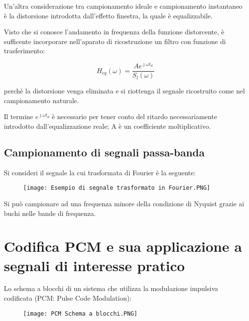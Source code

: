 Un'altra considerazione tra campionamento ideale e campionamento instantaneo è la distorsione introdotta dall'effetto finestra, la quale è equalizzabile. \newline 

Visto che si conosce l'andamento in frequenza della funzione distorcente, è sufficente incorporare 
nell'aparato di ricostruzione un filtro con funzione di trasferimento: 

{
    \Large 
    \begin{equation}
        H_{eq} (\omega) = 
        \frac{A e^{\jmath \omega t_d}}{S_l (\omega)} 
    \end{equation}
}

perchè la distorsione venga eliminata e si riottenga il segnale ricostruito come nel campionamento naturale. \newline 

Il termine $e^{\jmath \omega t_d}$ è necessario per tener conto del ritardo necessariamente introdotto dall'equalizzazione reale; 
A è un coefficiente moltiplicativo. \newline 

\newpage 

\subsection{Campionamento di segnali passa-banda} 

Si consideri il segnale la cui trasformata di Fourier è la seguente: 

\begin{figure}[h]
    \centering
    \texttt{[image: Esempio di segnale trasformato in Fourier.PNG]}
\end{figure}

Si può campionare ad una frequenza minore della condizione di Nyquist grazie ai buchi nelle bande di frequenza. \newline 

\newpage 

\section{Codifica PCM e sua applicazione a segnali di interesse pratico} 

Lo schema a blocchi di un sistema che utilizza la modulazione impulsiva codificata (PCM: Pulse Code Modulation): 

\begin{figure}[h]
    \centering
    \texttt{[image: PCM Schema a blocchi.PNG]}
\end{figure}

